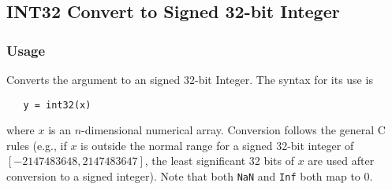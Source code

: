 %
%
%
\subsection{INT32 Convert to Signed 32-bit Integer}
\subsubsection{Usage}
Converts the argument to an signed 32-bit Integer.  The syntax
for its use is
\begin{verbatim}
   y = int32(x)
\end{verbatim}
where $x$ is an $n$-dimensional numerical array.  Conversion
follows the general C rules (e.g., if $x$ is outside the normal
range for a signed 32-bit integer of $[-2147483648,2147483647]$, the least significant
32 bits of $x$ are used after conversion to a signed integer).  Note that
both \verb|NaN| and \verb|Inf| both map to 0.
